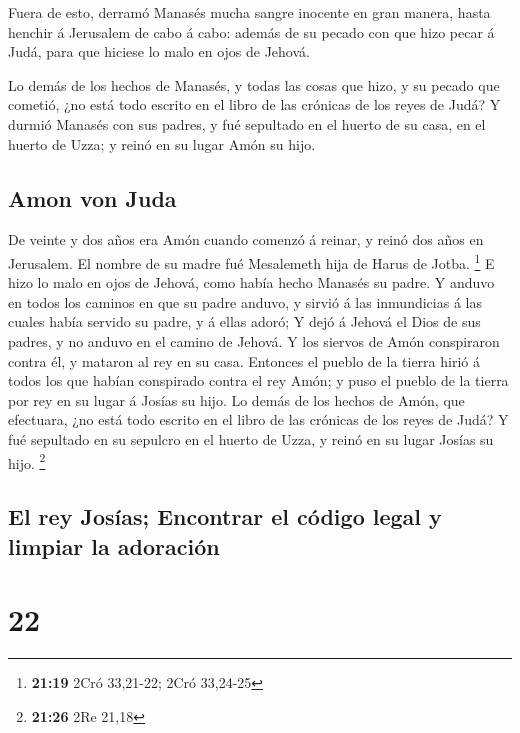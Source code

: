  Fuera de esto, derramó Manasés mucha sangre inocente en
gran manera, hasta henchir á Jerusalem de cabo á cabo: además de su
pecado con que hizo pecar á Judá, para que hiciese lo malo en ojos de
Jehová.

 Lo demás de los hechos de Manasés, y todas las cosas que
hizo, y su pecado que cometió, ¿no está todo escrito en el libro de las
crónicas de los reyes de Judá?  Y durmió Manasés con sus
padres, y fué sepultado en el huerto de su casa, en el huerto de Uzza; y
reinó en su lugar Amón su hijo.

\hypertarget{amon-von-juda}{%
\subsection{Amon von Juda}\label{amon-von-juda}}

 De veinte y dos años era Amón cuando comenzó á reinar, y
reinó dos años en Jerusalem. El nombre de su madre fué Mesalemeth hija
de Harus de Jotba. \footnote{\textbf{21:19} 2Cró 33,21-22; 2Cró 33,24-25}
 E hizo lo malo en ojos de Jehová, como había hecho
Manasés su padre.  Y anduvo en todos los caminos en que
su padre anduvo, y sirvió á las inmundicias á las cuales había servido
su padre, y á ellas adoró;  Y dejó á Jehová el Dios de
sus padres, y no anduvo en el camino de Jehová.  Y los
siervos de Amón conspiraron contra él, y mataron al rey en su casa.
 Entonces el pueblo de la tierra hirió á todos los que
habían conspirado contra el rey Amón; y puso el pueblo de la tierra por
rey en su lugar á Josías su hijo.  Lo demás de los hechos
de Amón, que efectuara, ¿no está todo escrito en el libro de las
crónicas de los reyes de Judá?  Y fué sepultado en su
sepulcro en el huerto de Uzza, y reinó en su lugar Josías su hijo.
\footnote{\textbf{21:26} 2Re 21,18}

\hypertarget{el-rey-josuxedas-encontrar-el-cuxf3digo-legal-y-limpiar-la-adoraciuxf3n}{%
\subsection{El rey Josías; Encontrar el código legal y limpiar la
adoración}\label{el-rey-josuxedas-encontrar-el-cuxf3digo-legal-y-limpiar-la-adoraciuxf3n}}

\hypertarget{section-21}{%
\section{22}\label{section-21}}


